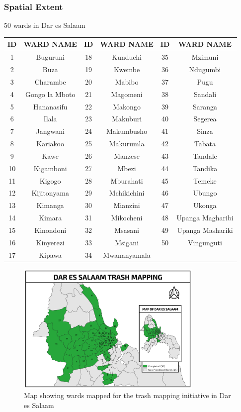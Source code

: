 \documentclass[a4paper,12pt,twoside]{article}
\begin{document}
\subsubsection{Spatial Extent}
50 wards in Dar es Salaam

\begin{center}
\begin{tabular}{|c|c|c|c|c|c|}
\hline
ID & WARD NAME & ID & WARD NAME & ID & WARD NAME\\
\hline
1 & Buguruni & 18 & Kunduchi & 35 & Mzimuni\\
2 & Buza & 19 & Kwembe & 36 & Ndugumbi\\
3 & Charambe & 20 & Mabibo & 37 & Pugu\\
4 & Gongo la Mboto & 21 & Magomeni & 38 & Sandali\\
5 & Hananasifu & 22 & Makongo & 39 & Saranga\\
6 & Ilala & 23 & Makuburi & 40 & Segerea\\
7 & Jangwani & 24 & Makumbusho & 41 & Sinza\\
8 & Kariakoo & 25 & Makurumla & 42 & Tabata\\
9 & Kawe & 26 & Manzese & 43 & Tandale\\
10 & Kigamboni & 27 & Mbezi & 44 & Tandika\\
11 & Kigogo & 28 & Mburahati & 45 & Temeke\\
12 & Kijitonyama & 29 & Mchikichini & 46 & Ubungo\\
13 & Kimanga & 30 & Mianzini & 47 & Ukonga\\
14 & Kimara & 31 & Mikocheni & 48 & Upanga Magharibi\\
15 & Kinondoni & 32 & Msasani & 49 & Upanga Mashariki\\
16 & Kinyerezi & 33 & Msigani & 50 & Vingunguti\\
17 & Kipawa & 34 & Mwananyamala & {} & {}\\
 \hline
\end{tabular}
\end{center}

\begin{figure}[h]
  \caption{Map showing wards mapped for the trash mapping initiative in Dar es Salaam}
  \centering
 \includegraphics[width=0.8\textwidth]{images/Dar_Trash_Map.png}
\end{figure}
\end{document}
